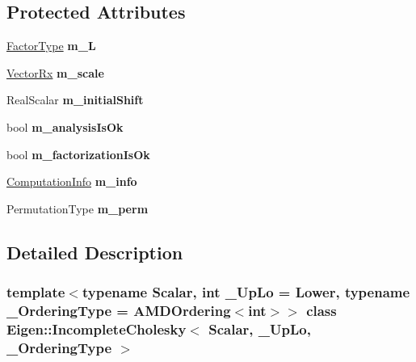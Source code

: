 \subsection*{Protected Attributes}
\begin{DoxyCompactItemize}
\item 
\mbox{\label{class_eigen_1_1_incomplete_cholesky_ac9bb29d22c7a1ecbb32212d9ea228b40}} 
\hyperlink{group___sparse_core___module}{Factor\+Type} {\bfseries m\+\_\+L}
\item 
\mbox{\label{class_eigen_1_1_incomplete_cholesky_aa4281d82edea96d9b2c7f696140c7401}} 
\hyperlink{group___core___module}{Vector\+Rx} {\bfseries m\+\_\+scale}
\item 
\mbox{\label{class_eigen_1_1_incomplete_cholesky_a3a42e45e865228d446a3c6b49f474e87}} 
Real\+Scalar {\bfseries m\+\_\+initial\+Shift}
\item 
\mbox{\label{class_eigen_1_1_incomplete_cholesky_a5f034fe49d026dfef22a97a403d8aa4c}} 
bool {\bfseries m\+\_\+analysis\+Is\+Ok}
\item 
\mbox{\label{class_eigen_1_1_incomplete_cholesky_aab7215c08a43657abdaef848c3b90947}} 
bool {\bfseries m\+\_\+factorization\+Is\+Ok}
\item 
\mbox{\label{class_eigen_1_1_incomplete_cholesky_abe5b6ad3c0a85dcd824a00697b490eac}} 
\hyperlink{group__enums_ga85fad7b87587764e5cf6b513a9e0ee5e}{Computation\+Info} {\bfseries m\+\_\+info}
\item 
\mbox{\label{class_eigen_1_1_incomplete_cholesky_acf5b562033401cd9b308259cd91a663e}} 
Permutation\+Type {\bfseries m\+\_\+perm}
\end{DoxyCompactItemize}


\subsection{Detailed Description}
\subsubsection*{template$<$typename Scalar, int \+\_\+\+Up\+Lo = Lower, typename \+\_\+\+Ordering\+Type = A\+M\+D\+Ordering$<$int$>$$>$\newline
class Eigen\+::\+Incomplete\+Cholesky$<$ Scalar, \+\_\+\+Up\+Lo, \+\_\+\+Ordering\+Type $>$}

